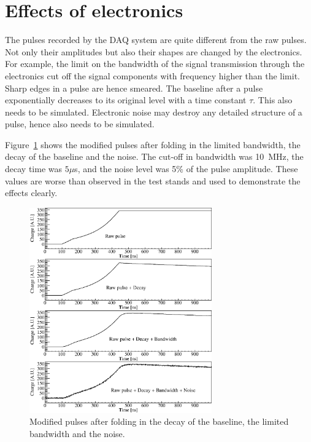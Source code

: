 \section{Effects of electronics}
\label{sec:pss:dbn}
The pulses recorded by the DAQ system are quite different from the raw pulses. Not only their amplitudes but also their shapes are changed by the electronics. For example, the limit on the bandwidth of the signal transmission through the electronics cut off the signal components with frequency higher than the limit. Sharp edges in a pulse are hence smeared. The baseline after a pulse exponentially decreases to its original level with a time constant $\tau$. This also needs to be simulated. Electronic noise may destroy any detailed structure of a pulse, hence also needs to be simulated.

Figure~\ref{fig:pss:elec} shows the modified pulses after folding in the limited bandwidth, the decay of the baseline and the noise. The cut-off in bandwidth was 10~MHz, the decay time was $5 \mu$s, and the noise level was 5\% of the pulse amplitude. These values are worse than observed in the test stands and used to demonstrate the effects clearly.
\begin{figure}[htbp]
\centering
\includegraphics[width=0.7\textwidth]{PSDBN}
\caption{Modified pulses after folding in the decay of the baseline, the limited bandwidth and the noise.}
\label{fig:pss:elec}
\end{figure}


